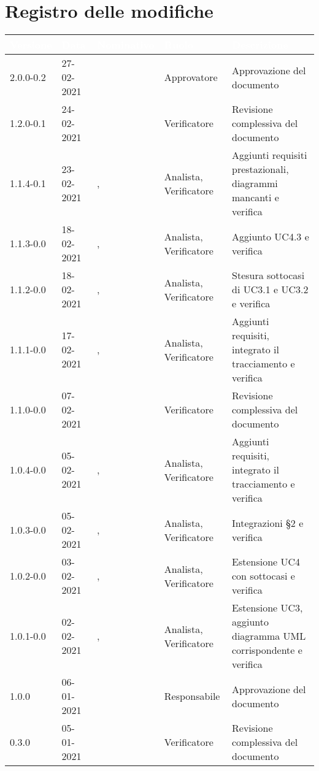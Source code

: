 \section*{Registro delle modifiche}
{
\setcounter{table}{-1}
{
\setlength\arrayrulewidth{1pt}
\renewcommand{\arraystretch}{1.5}
\centering
\begin{longtable}{C{1.7cm} | C{2.5cm} | C{3.2cm} | C{2.7cm}  | C{4.8cm}}
\textcolor{white}{\textbf{Versione}}&
\textcolor{white}{\textbf{Data}}&
\textcolor{white}{\textbf{Nominativo}}&
\textcolor{white}{\textbf{Ruolo}}&
\textcolor{white}{\textbf{Descrizione}}\\	
\endhead

2.0.0-0.2 & 27-02-2021 & \ZM{} & Approvatore & Approvazione del documento\\
1.2.0-0.1 & 24-02-2021 & \SH{} & Verificatore & Revisione complessiva del documento\\
1.1.4-0.1 & 23-02-2021 & \RA{}, \SG{} & Analista, Verificatore & Aggiunti requisiti prestazionali, diagrammi mancanti e verifica\\
1.1.3-0.0 & 18-02-2021 & \PA{}, \SG{} & Analista, Verificatore & Aggiunto UC4.3 e verifica\\
1.1.2-0.0 & 18-02-2021 & \RA{}, \SG{} & Analista, Verificatore & Stesura sottocasi di UC3.1 e UC3.2 e verifica\\
1.1.1-0.0 & 17-02-2021 & \PA{}, \BM{} & Analista, Verificatore & Aggiunti requisiti, integrato il tracciamento e verifica\\
1.1.0-0.0 & 07-02-2021 & \SH{} & Verificatore & Revisione complessiva del documento\\
1.0.4-0.0 & 05-02-2021 & \PA{}, \BM{} & Analista, Verificatore & Aggiunti requisiti, integrato il tracciamento e verifica\\
1.0.3-0.0 & 05-02-2021 & \PA{}, \BM{} & Analista, Verificatore & Integrazioni  \S2 e verifica\\
1.0.2-0.0 & 03-02-2021 & \ZM{}, \SH{} & Analista, Verificatore & Estensione UC4 con sottocasi e verifica\\
1.0.1-0.0 & 02-02-2021 & \ZM{}, \SH{} & Analista, Verificatore & Estensione UC3, aggiunto diagramma UML corrispondente  e verifica\\
1.0.0 & 06-01-2021 & \BM{} & Responsabile & Approvazione del documento \\

0.3.0 & 05-01-2021 & \PA{} & Verificatore & Revisione complessiva del documento \\


\end{longtable}}}
